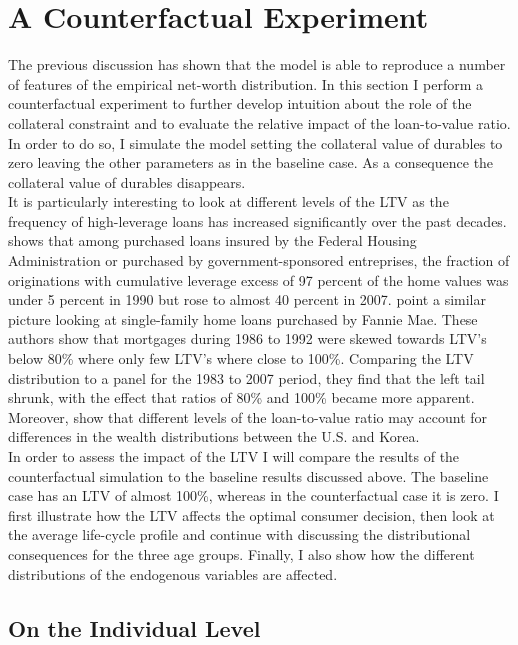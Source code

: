 \documentclass[a4paper,12pt,legno]{article}
\begin{document}
\section{A Counterfactual Experiment}
\label{counterfactual}
The previous discussion has shown that the model is able to reproduce a number of features of the empirical net-worth distribution. In this section I perform a counterfactual experiment to further develop intuition about the role of the collateral constraint and to evaluate the relative impact of the loan-to-value ratio. In order to do so, I simulate the model setting the collateral value of durables to zero leaving the other parameters as in the baseline case. As a consequence the collateral value of durables disappears.\\
It is particularly interesting to look at different levels of the LTV as the frequency of high-leverage loans has increased significantly over the past decades. \cite{pinto2010government} shows that among purchased loans insured by the Federal Housing Administration or purchased by government-sponsored entreprises, the fraction of originations with cumulative leverage excess of 97 percent of the home values was under 5 percent in 1990 but rose to almost 40 percent in 2007. \cite{bokhari2013did} point a similar picture looking at single-family home loans purchased by Fannie Mae. These authors show that mortgages during 1986 to 1992 were skewed towards LTV's below 80\% where only few LTV's where close to 100\%. Comparing the LTV distribution to a panel for the 1983 to 2007 period, they find that the left tail shrunk, with the effect that ratios of 80\% and 100\% became more apparent. Moreover, \cite{cho2012accounting} show that different levels of the loan-to-value ratio  may account for differences in the wealth distributions between the U.S. and Korea.\\
In order to assess the impact of the LTV I will compare the results of the counterfactual simulation to the baseline results discussed above. The baseline case has an LTV of almost 100\%, whereas in the counterfactual case it is zero. I first illustrate how the LTV affects the optimal consumer decision, then look at the average life-cycle profile and continue with discussing the distributional consequences for the three age groups. Finally, I also show how the different distributions of the endogenous variables are affected. 

\subsection{On the Individual Level}
\end{document}
